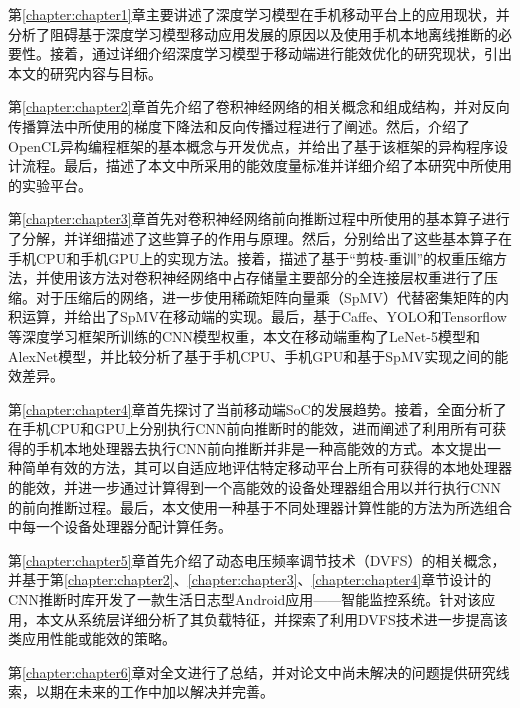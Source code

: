 第\ref{chapter:chapter1}章主要讲述了深度学习模型在手机移动平台上的应用现状，并分析了阻碍基于深度学习模型移动应用发展的原因以及使用手机本地离线推断的必要性。接着，通过详细介绍深度学习模型于移动端进行能效优化的研究现状，引出本文的研究内容与目标。

第\ref{chapter:chapter2}章首先介绍了卷积神经网络的相关概念和组成结构，并对反向传播算法中所使用的梯度下降法和反向传播过程进行了阐述。然后，介绍了OpenCL异构编程框架的基本概念与开发优点，并给出了基于该框架的异构程序设计流程。最后，描述了本文中所采用的能效度量标准并详细介绍了本研究中所使用的实验平台。

第\ref{chapter:chapter3}章首先对卷积神经网络前向推断过程中所使用的基本算子进行了分解，并详细描述了这些算子的作用与原理。然后，分别给出了这些基本算子在手机CPU和手机GPU上的实现方法。接着，描述了基于“剪枝-重训”的权重压缩方法，并使用该方法对卷积神经网络中占存储量主要部分的全连接层权重进行了压缩。对于压缩后的网络，进一步使用稀疏矩阵向量乘（SpMV）代替密集矩阵的内积运算，并给出了SpMV在移动端的实现。最后，基于Caffe、YOLO和Tensorflow等深度学习框架所训练的CNN模型权重，本文在移动端重构了LeNet-5\cite{lecun1998gradient}模型和AlexNet模型，并比较分析了基于手机CPU、手机GPU和基于SpMV实现之间的能效差异。

第\ref{chapter:chapter4}章首先探讨了当前移动端SoC的发展趋势。接着，全面分析了在手机CPU和GPU上分别执行CNN前向推断时的能效，进而阐述了利用所有可获得的手机本地处理器去执行CNN前向推断并非是一种高能效的方式。本文提出一种简单有效的方法，其可以自适应地评估特定移动平台上所有可获得的本地处理器的能效，并进一步通过计算得到一个高能效的设备处理器组合用以并行执行CNN的前向推断过程\cite{wang2017rethinking}。最后，本文使用一种基于不同处理器计算性能的方法为所选组合中每一个设备处理器分配计算任务。

第\ref{chapter:chapter5}章首先介绍了动态电压频率调节技术（DVFS）的相关概念，并基于第\ref{chapter:chapter2}、\ref{chapter:chapter3}、\ref{chapter:chapter4}章节设计的CNN推断时库开发了一款生活日志型Android应用——智能监控系统。针对该应用，本文从系统层详细分析了其负载特征，并探索了利用DVFS技术进一步提高该类应用性能或能效的策略。

第\ref{chapter:chapter6}章对全文进行了总结，并对论文中尚未解决的问题提供研究线索，以期在未来的工作中加以解决并完善。

\cleardoublepage 